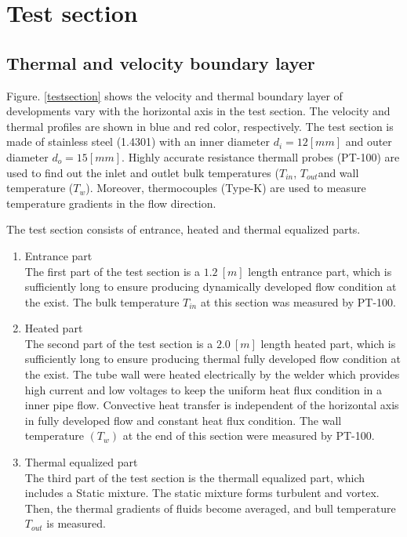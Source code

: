 \documentclass[12pt,oneside]{jbook}
\begin{document}
\section{Test section}

\subsection{Thermal and velocity boundary layer}
Figure. \ref{testsection} shows the velocity and thermal boundary layer of developments vary with the horizontal axis in the test section.
The velocity and thermal profiles are shown in blue and red color, respectively.
The test section is made of stainless steel (1.4301) with an inner diameter $d_{i}=12[mm]$ and outer diameter $d_{o}=15[mm]$.
Highly accurate resistance thermall probes (PT-100) are used to find out the inlet and outlet bulk temperatures ($T_{in}$, $T_{out}$and wall temperature ($T_{w}$).
Moreover, thermocouples (Type-K) are used to measure temperature gradients in the flow direction.

The test section consists of entrance, heated and thermal equalized parts.
\begin{enumerate}
  \item Entrance part\\
  The first part of the test section is a $1.2\ [m]$ length entrance part, which is sufficiently long to ensure producing dynamically developed flow condition at the exist.
  The bulk temperature $T_{in}$ at this section was measured by PT-100.
  \item Heated part\\
  The second part of the test section is a $2.0\ [m]$ length heated part, which is sufficiently long to ensure producing thermal fully developed flow condition at the exist.
  The tube wall were heated electrically by the welder which provides high current and low voltages to keep the uniform heat flux condition in a inner pipe flow.
  Convective heat transfer is independent of the horizontal axis in fully developed flow and constant heat flux condition.
  The wall temperature $(T_{w})$ at the end of this section were measured by PT-100.
  \item Thermal equalized part\\
  The third part of the test section is the thermall equalized part, which includes a Static mixture.
  The static mixture forms turbulent and vortex.
  Then, the thermal gradients of fluids become averaged, and bull temperature $T_{out}$ is measured.
\end{enumerate}
\end{document}
